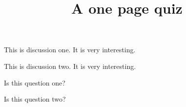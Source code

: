 \documentclass[one page]{webquiz}
\title{A one page quiz}
\begin{document}
  \begin{discussion}
        This is discussion one. It is very interesting.
  \end{discussion}
  \begin{discussion}
     This is discussion two. It is very interesting.
  \end{discussion}
  \begin{question} Is this question one? \end{question}
  \begin{question} Is this question two? \end{question}
\end{document}
